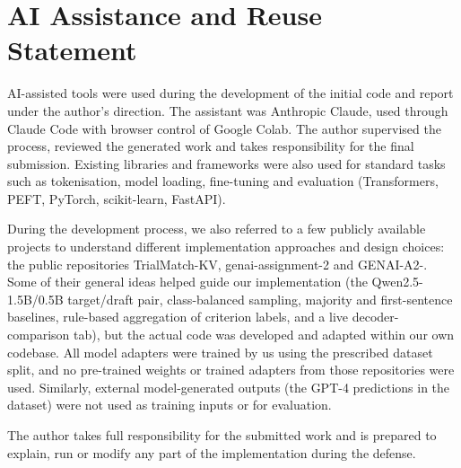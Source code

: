 \documentclass[conference]{IEEEtran}
\begin{document}
\appendices
\section{AI Assistance and Reuse Statement}
AI-assisted tools were used during the development of the initial code and report under the author's direction. The assistant was Anthropic Claude, used through Claude Code with browser control of Google Colab. The author supervised the process, reviewed the generated work and takes responsibility for the final submission. Existing libraries and frameworks were also used for standard tasks such as tokenisation, model loading, fine-tuning and evaluation (Transformers, PEFT, PyTorch, scikit-learn, FastAPI).

During the development process, we also referred to a few publicly available projects to understand different implementation approaches and design choices: the public repositories TrialMatch-KV, genai-assignment-2 and GENAI-A2-. Some of their general ideas helped guide our implementation (the Qwen2.5-1.5B/0.5B target/draft pair, class-balanced sampling, majority and first-sentence baselines, rule-based aggregation of criterion labels, and a live decoder-comparison tab), but the actual code was developed and adapted within our own codebase. All model adapters were trained by us using the prescribed dataset split, and no pre-trained weights or trained adapters from those repositories were used. Similarly, external model-generated outputs (the GPT-4 predictions in the dataset) were not used as training inputs or for evaluation.

The author takes full responsibility for the submitted work and is prepared to explain, run or modify any part of the implementation during the defense.
\end{document}

